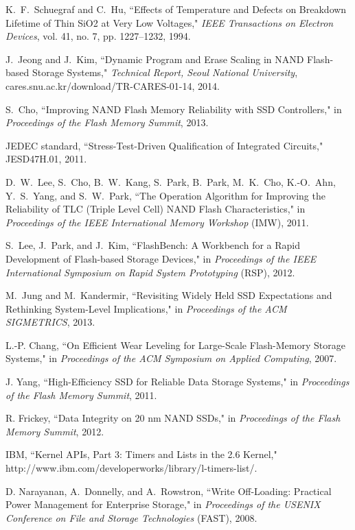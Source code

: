 \begin{thebibliography}{00}
K.~F.~Schuegraf and C.~Hu,
``Effects of Temperature and Defects on Breakdown Lifetime of Thin SiO2 at Very Low Voltages,"
\emph{IEEE Transactions on Electron Devices}, vol. 41, no. 7, pp. 1227--1232, 1994.

J.~Jeong and J.~Kim,
``Dynamic Program and Erase Scaling in NAND Flash-based Storage Systems,"
\emph{Technical Report, Seoul National University},
cares.snu.ac.kr/download/TR-CARES-01-14, 2014.

S.~Cho,
``Improving NAND Flash Memory Reliability with SSD Controllers,"
in \emph{Proceedings of the Flash Memory Summit}, 2013.

JEDEC standard,
``Stress-Test-Driven Qualification of Integrated Circuits,"
JESD47H.01, 2011.

D.~W.~Lee, S.~Cho, B.~W.~Kang, S.~Park, B.~Park, M.~K.~Cho, K.-O.~Ahn, Y.~S.~Yang, and S.~W.~Park,
``The Operation Algorithm for Improving the Reliability of TLC (Triple Level Cell) NAND Flash Characteristics,"
in \emph{Proceedings of the IEEE International Memory Workshop} (IMW), 2011.

S.~Lee, J.~Park, and J.~Kim,
``FlashBench: A Workbench for a Rapid Development of Flash-based Storage Devices,"
in \emph{Proceedings of the IEEE International Symposium on Rapid System Prototyping} (RSP), 2012.

M.~Jung and M.~Kandermir,
``Revisiting Widely Held SSD Expectations and Rethinking System-Level Implications,"
in \emph{Proceedings of the ACM SIGMETRICS}, 2013.

L.-P. Chang,
``On Efficient Wear Leveling for Large-Scale Flash-Memory Storage Systems,"
in \textit{Proceedings of the ACM Symposium on Applied Computing}, 2007.

J. Yang,
``High-Efficiency SSD for Reliable Data Storage Systems,"
in \textit{Proceedings of the Flash Memory Summit}, 2011.

R. Frickey,
``Data Integrity on 20 nm NAND SSDs,"
in \textit{Proceedings of the Flash Memory Summit}, 2012.

IBM,
``Kernel APIs, Part 3: Timers and Lists in the 2.6 Kernel,"
http://www.ibm.com/developerworks/library/l-timers-list/.

D. Narayanan, A.~Donnelly, and A.~Rowstron,
``Write Off-Loading: Practical Power Management for Enterprise Storage,"
in \textit{Proceedings of the USENIX Conference on File and Storage Technologies} (FAST), 2008.


\end{thebibliography}
